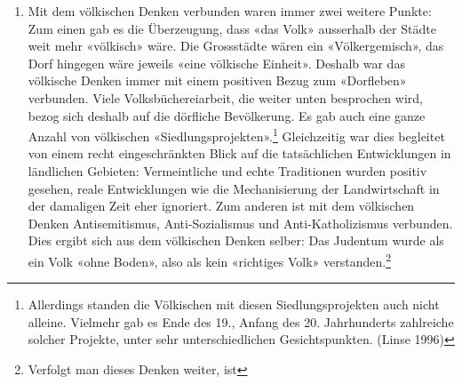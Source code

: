 \documentclass[a4paper,
fontsize=11pt,
oneside,
numbers=noperiodatend,
parskip=half-,
bibliography=totoc,
final
]{scrartcl}
\begin{document}
\begin{enumerate}
{    Ebenso werden die innerhalb Deutschlands lebenden Sorb*innen nie
    thematisiert.} Zweitens war das völkische Denken besessen von den
  Themen «Reinheit» und «Mischung». Menschen, wie gesagt, konnten laut
  diesem Denken «das eigene Volk» nicht verlassen. Und dennoch: In der
  Realität gab und gibt es immer Menschen, die genau das tun. Es gab und
  gibt immer freundschaftliche oder sexuelle Beziehungen und
  Familiengründungen von Menschen aus «unterschiedlichen Völkern». Es
  gab und gibt immer auch Staaten, in denen «unterschiedliche Völker»
  recht umstandslos miteinander leben. (Schon die Existenz der Schweiz
  war immer eine Herausforderung für das völkische Denken.) Im
  völkischen Denken ging es immer wieder darum, ob und wie das sein
  kann, welche Konsequenzen es hat -- sowohl für «das Volk» als auch für
  die einzelnen Menschen --, in welchem Masse es zugelassen werden
  sollte oder auch verhindert. Nicht zuletzt ging es immer wieder um
  «Gebiete», in denen es den völkischen Vorstellungen nach besonders oft
  zu solchen «Vermischungen» kommen würde -- Grossstädte, Grenzgebiete
  und «völkische Enklaven» auf dem Gebiet «anderer Völker».
\item
  Mit dem völkischen Denken verbunden waren immer zwei weitere Punkte:
  Zum einen gab es die Überzeugung, dass «das Volk» ausserhalb der
  Städte weit mehr «völkisch» wäre. Die Grossstädte wären ein
  «Völkergemisch», das Dorf hingegen wäre jeweils «eine völkische
  Einheit». Deshalb war das völkische Denken immer mit einem positiven
  Bezug zum «Dorfleben» verbunden. Viele Volksbüchereiarbeit, die weiter
  unten besprochen wird, bezog sich deshalb auf die dörfliche
  Bevölkerung. Es gab auch eine ganze Anzahl von völkischen
  «Siedlungsprojekten».\footnote{Allerdings standen die Völkischen mit
    diesen Siedlungsprojekten auch nicht alleine. Vielmehr gab es Ende
    des 19., Anfang des 20. Jahrhunderts zahlreiche solcher Projekte,
    unter sehr unterschiedlichen Gesichtspunkten. (Linse 1996)}
  Gleichzeitig war dies begleitet von einem recht eingeschränkten Blick
  auf die tatsächlichen Entwicklungen in ländlichen Gebieten:
  Vermeintliche und echte Traditionen wurden positiv gesehen, reale
  Entwicklungen wie die Mechanisierung der Landwirtschaft in der
  damaligen Zeit eher ignoriert. Zum anderen ist mit dem völkischen
  Denken Antisemitismus, Anti-Sozialismus und Anti-Katholizismus
  verbunden. Dies ergibt sich aus dem völkischen Denken selber: Das
  Judentum wurde als ein Volk «ohne Boden», also als kein «richtiges
  Volk» verstanden.\footnote{Verfolgt man dieses Denken weiter, ist
}
\end{enumerate}
\end{document}
